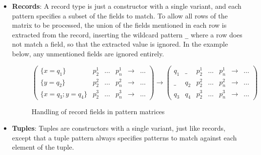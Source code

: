 \begin{itemize}
\item \textbf{Records}: A record type is just a constructor with a single variant, and each pattern specifies a subset of the fields to match.  To allow all rows of the matrix to be processed,  the union of the fields mentioned in each row is extracted from the record, inserting the wildcard pattern \verb|_| where a row does not match a field, so that the extracted value is ignored. In the example below, any unmentioned fields are ignored entirely.
\begin{figure}[H]
\hfill
$
\begin{pmatrix}
\{x=q_1\} & p^1_2 & \dots & p^1_n & \to & \dots \\
\{y=q_2\} & p^2_2 & \dots & p^2_n & \to &\dots \\
\{x=q_3; y=q_4\} & p^3_2 & \dots & p^3_n & \to &\dots
\end{pmatrix}
\to
\begin{pmatrix}
q_1 & \_ & p^1_2 & \dots & p^1_n  & \to & \dots \\
\_ & q_2 & p^2_2 & \dots & p^2_n  & \to & \dots \\
 q_3 & q_4 & p^3_2 & \dots & p^3_n  & \to & \dots
\end{pmatrix}
$
\hfill
\caption{Handling of record fields in pattern matrices}
\end{figure}

\item \textbf{Tuples}: Tuples are constructors with a single variant,  just like records, except that a tuple pattern always specifies patterns to match against each element of the tuple.
\end{itemize}



